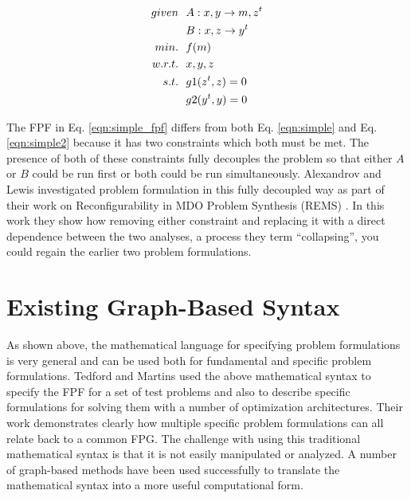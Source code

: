     \begin{align}
        given & \ \ A: {x,y} \rightarrow {m,z^t} \notag
        \\      & \ \ B: {x,z} \rightarrow {y^t} \notag
        \\min. &\ \ f(m) \notag
        \\w.r.t. & \ \ x,y,z \notag
        \\s.t. & \ \ g1(z^t,z) = 0 \notag
        \\     & \ \ g2(y^t,y) = 0
        \label{eqn:simple_fpf}
    \end{align}

    The FPF in Eq. \ref{eqn:simple_fpf} differs from both Eq. \ref{eqn:simple} and Eq. \ref{eqn:simple2} because it has 
    two constraints which both must be met. The presence of both of these constraints fully decouples the problem so that 
    either $A$ or $B$ could be run first or both could be run simultaneously. Alexandrov and Lewis investigated problem 
    formulation in this fully decoupled way as part of their work on 
    Reconfigurability in MDO Problem Synthesis (REMS) \cite{alexandrov2004}.
    In this work they show how removing either constraint and replacing 
    it with a direct dependence between the two analyses, a process they term ``collapsing'', 
    you could regain the earlier two problem formulations. 


\section{Existing Graph-Based Syntax}

    As shown above, the mathematical language for specifying problem formulations is very general and can be used both for 
    fundamental and specific problem formulations. Tedford and Martins used the above mathematical syntax to specify the 
    FPF for a set of test problems and also to describe specific formulations for solving them with a 
    number of optimization architectures\cite{Tedford2009}. Their work demonstrates clearly how multiple specific 
    problem formulations can all relate back to a common FPG. The challenge with using this 
    traditional mathematical syntax is that it is not easily manipulated or analyzed. 
    A number of graph-based methods have been used successfully to translate the 
    mathematical syntax into a more useful computational form. 
    
